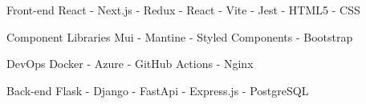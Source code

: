 

\begin{cvskills}
    
  \cvskill
    {Front-end} %
    {React - Next.js - Redux - React - Vite - Jest - HTML5 - CSS} %

\cvskill
  {Component Libraries} %
  {Mui - Mantine - Styled Components - Bootstrap} %
    
  \cvskill
    {DevOps} %
    {Docker - Azure - GitHub Actions - Nginx} %

  \cvskill
    {Back-end} %
    {Flask - Django - FastApi - Express.js -  PostgreSQL} %


\end{cvskills}
